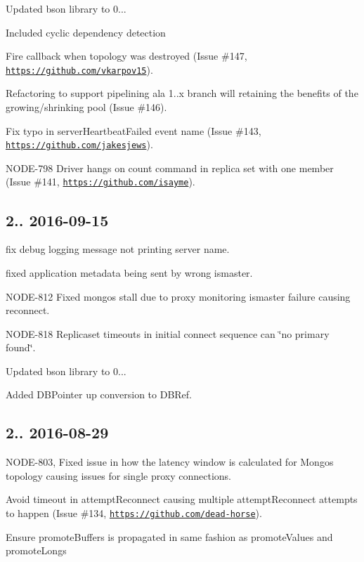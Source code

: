 \begin{DoxyItemize}
\item Updated bson library to 0...
\begin{DoxyItemize}
\item Included cyclic dependency detection
\end{DoxyItemize}
\item Fire callback when topology was destroyed (Issue \#147, \href{https://github.com/vkarpov15}{\tt https\+://github.\+com/vkarpov15}).
\item Refactoring to support pipelining ala 1..\+x branch will retaining the benefits of the growing/shrinking pool (Issue \#146).
\item Fix typo in server\+Heartbeat\+Failed event name (Issue \#143, \href{https://github.com/jakesjews}{\tt https\+://github.\+com/jakesjews}).
\item N\+O\+D\+E-\/798 Driver hangs on count command in replica set with one member (Issue \#141, \href{https://github.com/isayme}{\tt https\+://github.\+com/isayme}).
\end{DoxyItemize}

\subsection*{2.. 2016-\/09-\/15 }


\begin{DoxyItemize}
\item fix debug logging message not printing server name.
\item fixed application metadata being sent by wrong ismaster.
\item N\+O\+D\+E-\/812 Fixed mongos stall due to proxy monitoring ismaster failure causing reconnect.
\item N\+O\+D\+E-\/818 Replicaset timeouts in initial connect sequence can \char`\"{}no primary found\char`\"{}.
\item Updated bson library to 0...
\item Added D\+B\+Pointer up conversion to D\+B\+Ref.
\end{DoxyItemize}

\subsection*{2.. 2016-\/08-\/29 }


\begin{DoxyItemize}
\item N\+O\+D\+E-\/803, Fixed issue in how the latency window is calculated for Mongos topology causing issues for single proxy connections.
\item Avoid timeout in attempt\+Reconnect causing multiple attempt\+Reconnect attempts to happen (Issue \#134, \href{https://github.com/dead-horse}{\tt https\+://github.\+com/dead-\/horse}).
\item Ensure promote\+Buffers is propagated in same fashion as promote\+Values and promote\+Longs
\end{DoxyItemize}

